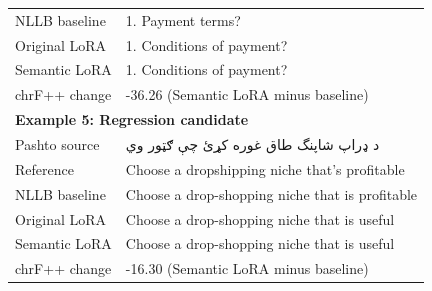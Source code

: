 \begin{table}[t]
\begin{tabularx}{\textwidth}{p{}X}
NLLB baseline & 1. Payment terms? \\
Original LoRA & 1. Conditions of payment? \\
Semantic LoRA & 1. Conditions of payment? \\
chrF++ change & -36.26 (Semantic LoRA minus baseline) \\
\midrule
\multicolumn{2}{l}{\textbf{Example 5: Regression candidate}} \\
Pashto source & د ډراپ شاپنگ طاق غوره کړئ چې ګټور وي \\
Reference & Choose a dropshipping niche that's profitable \\
NLLB baseline & Choose a drop-shopping niche that is profitable \\
Original LoRA & Choose a drop-shopping niche that is useful \\
Semantic LoRA & Choose a drop-shopping niche that is useful \\
chrF++ change & -16.30 (Semantic LoRA minus baseline) \\
\midrule
\bottomrule
\end{tabularx}
\end{table}